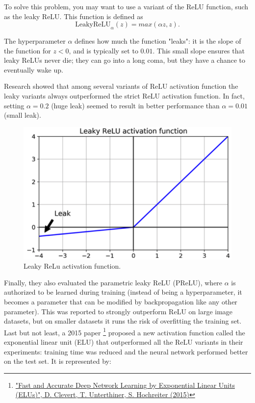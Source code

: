 To solve this problem, you may want to use a variant of the ReLU function, such as the leaky ReLU. This function is defined as
\begin{equation}
\text{LeakyReLU}_\alpha(z) = max(\alpha z, z).
\end{equation}

The hyperparameter $\alpha$ defines how much the function "leaks": it is the slope of the function for $z < 0$, and is typically set to $0.01$. This small slope ensures that leaky ReLUs never die; they can go into a long coma, but they have a chance to eventually wake up. 

Research showed that among several variants of ReLU activation function the leaky variants always outperformed the strict ReLU activation function. In fact, setting $\alpha= 0.2$ (huge leak) seemed to result in better performance than $\alpha = 0.01$ (small leak).
\begin{figure}
\centering
\includegraphics[scale=0.4]{img/lrelu}
\caption{Leaky ReLu activation function.}
\end{figure}
Finally, they also evaluated the parametric leaky ReLU (PReLU), where $\alpha$ is authorized to be learned during training (instead of being a hyperparameter, it becomes a parameter that can be modified by backpropagation like any other parameter). This was reported to strongly outperform ReLU on large image datasets, but on smaller datasets it runs the risk of overfitting the training set. Last but not least, a 2015 paper \footnote{\href{https://homl.info/50}{"Fast and Accurate Deep Network Learning by Exponential Linear Units (ELUs)",  D. Clevert, T. Unterthiner, S. Hochreiter (2015)}} proposed a new activation function called the exponential linear unit (ELU) that outperformed all the ReLU variants in their experiments: training time was reduced and the neural network performed better on the test set. It is represented by:
